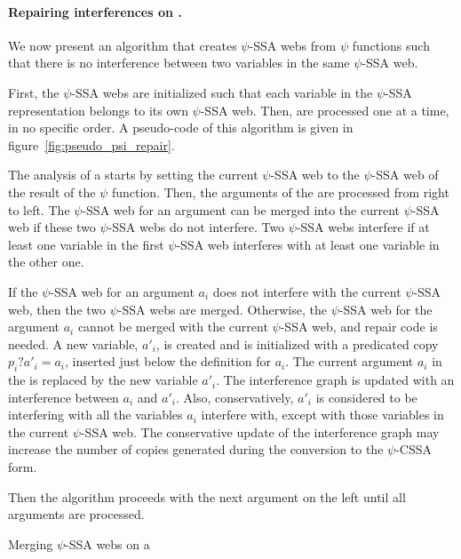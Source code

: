 \paragraph{Repairing interferences on \psifuns.}
We now present an algorithm that creates $\psi$-SSA webs from $\psi$
functions such that there is no interference between two variables in
the same $\psi$-SSA web.

First, the $\psi$-SSA webs are initialized such that each variable in
the $\psi$-SSA representation belongs to its own $\psi$-SSA web. Then,
\psifuns are processed one at a time, in no specific order. A
pseudo-code of this algorithm is given in
figure~\ref{fig:pseudo_psi_repair}.

The analysis of a \psifun starts by setting the current
$\psi$-SSA web to the $\psi$-SSA web of the result of the $\psi$
function. Then, the arguments of the \psifun are processed
from right to left. The $\psi$-SSA web for an argument can be merged
into the current $\psi$-SSA web if these two $\psi$-SSA webs do not
interfere. Two $\psi$-SSA webs interfere if at least one variable in
the first $\psi$-SSA web interferes with at least one variable in the
other one.

If the $\psi$-SSA web for an argument ${a_i}$ does not interfere
with the current $\psi$-SSA web, then the two $\psi$-SSA webs are
merged. Otherwise, the $\psi$-SSA web for the argument ${a_i}$
cannot be merged with the current $\psi$-SSA web, and repair code is
needed. A new variable, ${a'_i}$, is created and is initialized
with a predicated copy ${p_i? a'_i = a_i}$, inserted just below
the definition for ${a_i}$. The current argument ${a_i}$ in
the \psifun is replaced by the new variable ${a'_i}$. The
interference graph is updated with an interference between ${a_i}$
and ${a'_i}$. Also, conservatively, ${a'_i}$ is considered to
be interfering with all the variables ${a_i}$ interfere with,
except with those variables in the current $\psi$-SSA web. The
conservative update of the interference graph may increase the number
of copies generated during the conversion to the $\psi$-CSSA form.

Then the algorithm proceeds with the next argument on the left until
all arguments are processed.

\begin{algorithm}[h]
\caption{Merging $\psi$-SSA webs on a \psifun}
\label{fig:pseudo_psi_repair}
\end{algorithm}


